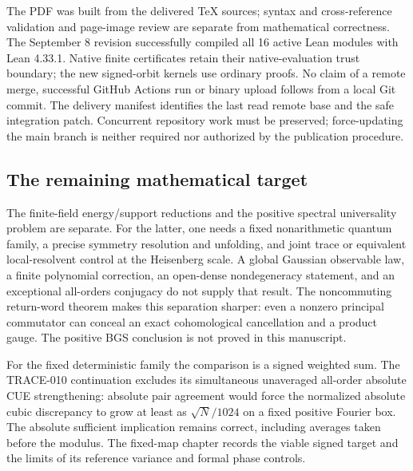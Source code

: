 The PDF was built from the delivered TeX sources; syntax and cross-reference
validation and page-image review are separate from mathematical correctness.
The September 8 revision successfully compiled all 16 active Lean modules
with Lean 4.33.1. Native finite certificates retain their native-evaluation
trust boundary; the new signed-orbit kernels use ordinary proofs. No claim of a
remote merge, successful GitHub Actions run or binary upload follows from
a local Git commit. The delivery manifest identifies the last read remote
base and the safe integration patch. Concurrent repository work must be
preserved; force-updating the main branch is neither required nor authorized
by the publication procedure.

\subsection{The remaining mathematical target}
The finite-field energy/support reductions and the positive spectral
universality problem are separate. For the latter, one needs a fixed
nonarithmetic quantum family, a precise symmetry resolution and unfolding,
and joint trace or equivalent local-resolvent control at the Heisenberg scale.
A global Gaussian observable law, a finite polynomial correction, an
open-dense nondegeneracy statement, and an exceptional all-orders conjugacy
do not supply that result. The noncommuting return-word theorem makes this
separation sharper: even a nonzero principal commutator can conceal an exact
cohomological cancellation and a product gauge. The positive BGS conclusion
is not proved in this manuscript.

For the fixed deterministic family the comparison is a signed weighted
sum. The TRACE-010 continuation excludes its simultaneous unaveraged
all-order absolute CUE strengthening: absolute pair agreement would force
the normalized absolute cubic discrepancy to grow at least as
$\sqrt N/1024$ on a fixed positive Fourier box. The absolute sufficient
implication remains correct, including averages taken before the modulus.
The fixed-map chapter records the viable signed target and the limits
of its reference variance and formal phase controls.
